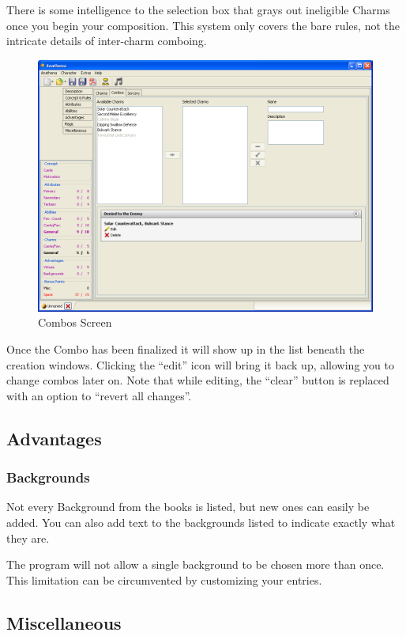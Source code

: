 There is some intelligence to the selection box that grays out ineligible Charms once you begin your composition. This system only covers the bare rules, not the intricate details of inter-charm comboing.

\begin{figure}
	\centering
		\includegraphics[width=1.00\textwidth]{images/Combos.png}
	\caption{Combos Screen}
	\label{fig:Combos}
\end{figure}

Once the Combo has been finalized it will show up in the list beneath the creation windows. Clicking the  "`edit"' icon will bring it back up, allowing you to change combos later on. Note that while editing, the "`clear"' button is replaced with an option to "`revert all changes"'.

\subsection{Advantages}
\subsubsection{Backgrounds}
Not every Background from the books is listed, but new ones can easily be added. You can also add text to the backgrounds listed to indicate exactly what they are. 

The program will not allow a single background to be chosen more than once. This limitation can be circumvented by customizing your entries.

\subsection{Miscellaneous}
